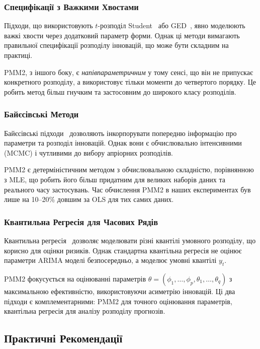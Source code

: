 \documentclass[12pt,a4paper]{article}
\begin{document}
\subsubsection{Специфікації з Важкими Хвостами}

Підходи, що використовують $t$-розподіл Student~\cite{harvey2013dynamic} або GED~\cite{box2015time}, явно моделюють важкі хвости через додатковий параметр форми. Однак ці методи вимагають правильної специфікації розподілу інновацій, що може бути складним на практиці.

PMM2, з іншого боку, є \textit{напівпараметричним} у тому сенсі, що він не припускає конкретного розподілу, а використовує тільки моменти до четвертого порядку. Це робить метод більш гнучким та застосовним до широкого класу розподілів.

\subsubsection{Байєсівські Методи}

Байєсівські підходи~\cite{fruhwirth2006finite, nakajima2012generalized} дозволяють інкорпорувати попередню інформацію про параметри та розподіл інновацій. Однак вони є обчислювально інтенсивними (MCMC) і чутливими до вибору апріорних розподілів.

PMM2 є детерміністичним методом з обчислювальною складністю, порівнянною з MLE, що робить його більш придатним для великих наборів даних та реального часу застосувань. Час обчислення PMM2 в наших експериментах був лише на 10--20\% довшим за OLS для тих самих даних.

\subsubsection{Квантильна Регресія для Часових Рядів}

Квантильна регресія~\cite{koenker2005quantile} дозволяє моделювати різні квантілі умовного розподілу, що корисно для оцінки ризиків. Однак стандартна квантільна регресія не оцінює параметри ARIMA моделі безпосередньо, а моделює умовні квантілі $y_t$.

PMM2 фокусується на оцінюванні параметрів $\theta = (\phi_1, \ldots, \phi_p, \theta_1, \ldots, \theta_q)$ з максимальною ефективністю, використовуючи асиметрію інновацій. Ці два підходи є комплементарними: PMM2 для точного оцінювання параметрів, квантільна регресія для аналізу розподілу прогнозів.

\subsection{Практичні Рекомендації}
\label{subsec:practical_guidelines}
\end{document}
